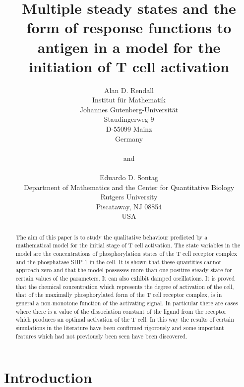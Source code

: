 \documentclass{article}
\begin{document}
\title{Multiple steady states and the form of response functions to antigen 
in a model for the initiation of T cell activation}

\author{Alan D. Rendall\\
Institut f\"ur Mathematik\\
Johannes Gutenberg-Universit\"at\\
Staudingerweg 9\\
D-55099 Mainz\\
Germany\\
\\
and\\
\\
Eduardo D. Sontag\\
Department of Mathematics and the Center for Quantitative Biology\\
Rutgers University\\
Piscataway, NJ 08854\\
USA}

\date{}

\maketitle

\begin{abstract}
The aim of this paper is to study the qualitative behaviour 
predicted by a mathematical model for the initial stage of T cell activation. 
The state variables in the model are the concentrations of phosphorylation 
states of the T cell receptor complex and the phosphatase SHP-1 in the 
cell. It is shown that these quantities cannot approach zero and that the 
model possesses more than one positive steady state for certain values of the 
parameters. It can also exhibit damped oscillations. It is proved that the 
chemical concentration which represents the degree of activation of the cell,
that of the maximally phosphorylated form of the T cell receptor complex, is 
in general a non-monotone function of the activating signal. In particular 
there are cases where there is a value of the dissociation constant of the 
ligand from the receptor which produces an optimal activation of the T cell.  
In this way the results of certain simulations in the literature have 
been confirmed rigorously and some important features which had not previously 
been seen have been discovered.
\end{abstract}

\section{Introduction}
\end{document}
